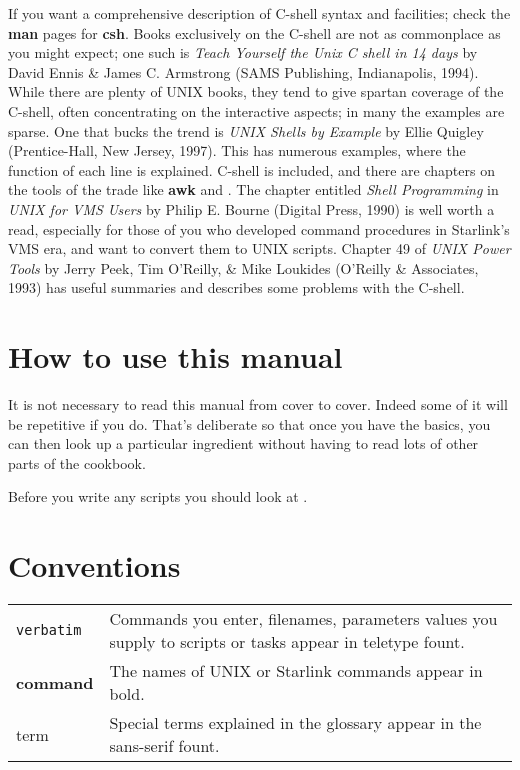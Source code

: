 If you want a comprehensive description of C-shell syntax and
facilities; check the {\bf man} pages for {\bf csh}.  Books
exclusively on the C-shell are not as commonplace as you might expect;
one such is {\sl Teach Yourself the Unix C shell in 14 days} by David
Ennis \& James C. Armstrong (SAMS Publishing, Indianapolis, 1994).
While there are plenty of UNIX books, they tend to give spartan
coverage of the C-shell, often concentrating on the interactive
aspects; in many the examples are sparse.  One that bucks the trend is
{\sl UNIX Shells by Example} by Ellie Quigley (Prentice-Hall, New
Jersey, 1997).  This has numerous examples, where the function of each
line is explained.  C-shell is included, and there are chapters on the
tools of the trade like {\bf awk} and .  The chapter entitled {\it Shell
Programming\/} in {\sl UNIX for VMS Users\/} by Philip E. Bourne
(Digital Press, 1990) is well worth a read, especially for those of
you who developed command procedures in Starlink's VMS era, and want
to convert them to UNIX scripts.  Chapter 49 of {\sl UNIX Power Tools}
by Jerry Peek, Tim O'Reilly, \& Mike Loukides (O'Reilly \& Associates,
1993) has useful summaries and describes some problems with the
C-shell.

\newpage

\section{How to use this manual}

It is not necessary to read this manual from cover to cover.  Indeed
some of it will be repetitive if you do.  That's deliberate so that
once you have the basics, you can then look up a particular ingredient
without having to read lots of other parts of the cookbook.

Before you write any scripts you should look at
.

\section{Conventions}
\begin{tabular}{lp{120mm}}
{\tt verbatim}   &  Commands you enter, filenames, parameters values
                    you supply to scripts or tasks appear in teletype
                    fount. \\
{\bf command}    &  The names of UNIX or Starlink commands appear
                    in bold. \\
{\sf term}       &  Special terms explained in the glossary appear
                    in the sans-serif fount. \\
\end{tabular}

